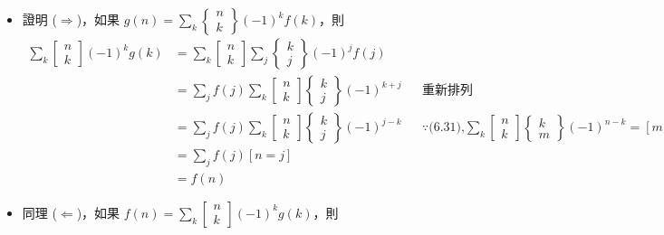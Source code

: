 \documentclass[11pt]{article}
\begin{document}
\begin{itemize}
	\item 證明 ($\Rightarrow$)，如果 $g(n) = \sum_{k} \begin{Bmatrix} n \\ k \end{Bmatrix} (-1)^{k} f(k)$，則
		\begin{align*}
			\sum_{k} \begin{bmatrix} n \\ k \end{bmatrix} (-1)^{k} g(k) 
				&=	\sum_{k} \begin{bmatrix} n \\ k \end{bmatrix} 
					\sum_j \begin{Bmatrix} k \\ j \end{Bmatrix}(-1)^j f(j)\\
				&=	\sum_{j} f(j) \sum_{k} \begin{bmatrix} n \\ k \end{bmatrix}
					\begin{Bmatrix} k \\ j \end{Bmatrix} (-1)^{k+j} 
						&& \text{重新排列}\\
				&=	\sum_{j} f(j) \sum_{k} \begin{bmatrix} n \\ k \end{bmatrix}
					\begin{Bmatrix} k \\ j \end{Bmatrix} (-1)^{j-k} 
						&& \because \text{(6.31),} 
						\sum_{k} \begin{bmatrix} n \\ k \end{bmatrix}
						\begin{Bmatrix} k \\ m \end{Bmatrix} (-1)^{n-k} = [m = n] \\
				&= \sum_{j} f(j) [n = j]\\
				&= f(n)
		\end{align*}
	\item 同理 ($\Leftarrow$)，如果 $f(n) = \sum_{k} \begin{bmatrix} n \\ k \end{bmatrix} (-1)^{k} g(k)$，則
		\begin{align*}

\end{align*}
\end{itemize}
\end{document}
